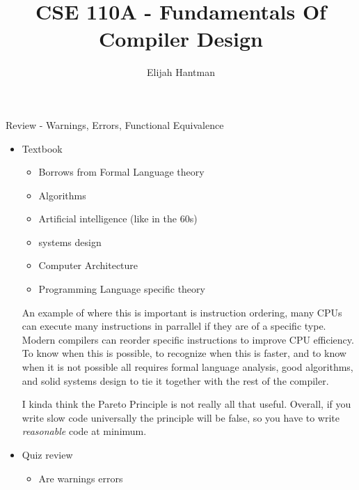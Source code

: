 \documentclass{report}
\title{\Huge{CSE 110A - Fundamentals Of Compiler Design}}
\author{\huge{Elijah Hantman}}
\date{}
\begin{document}
\maketitle
\newpage

\begin{description}
    \item Review - Warnings, Errors, Functional Equivalence 
        \begin{itemize}
            \item Textbook
                \begin{itemize}
                    \item Borrows from Formal Language theory
                    \item Algorithms
                    \item Artificial intelligence (like in the 60s)
                    \item systems design
                    \item Computer Architecture
                    \item Programming Language specific theory 
                \end{itemize}
                \begin{mdframed}
                    An example of where this is important is instruction ordering,
                    many CPUs can execute many instructions in parrallel if they
                    are of a specific type. Modern compilers can reorder specific
                    instructions to improve CPU efficiency. To know when this is possible,
                    to recognize when this is faster, and to know when it is not possible
                    all requires formal language analysis, good algorithms, and
                    solid systems design to tie it together with the rest of the
                    compiler.
                \end{mdframed}
                \begin{mdframed}
                    I kinda think the Pareto Principle is not really all that useful.
                    Overall, if you write slow code universally the principle will be false,
                    so you have to write \textit{reasonable} code at minimum.
                \end{mdframed}
            \item Quiz review
                \begin{itemize}
                    \item Are warnings errors

\end{itemize}
\end{itemize}
\end{description}
\end{document}
